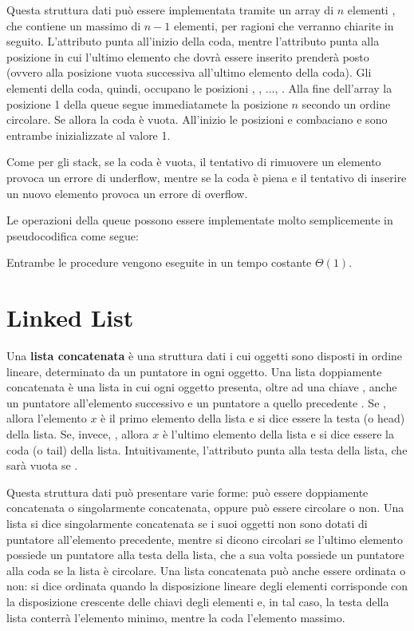 Questa struttura dati può essere implementata tramite un array di \(n\) elementi , che contiene un massimo di \(n-1\) elementi, per ragioni che verranno chiarite in seguito. L'attributo  punta all'inizio della coda, mentre l'attributo  punta alla posizione in cui l'ultimo elemento che dovrà essere inserito prenderà posto (ovvero alla posizione vuota successiva all'ultimo elemento della coda). Gli elementi della coda, quindi, occupano le posizioni , , ..., . Alla fine dell'array la posizione 1 della queue segue immediatamete la posizione \(n\) secondo un ordine circolare. Se  allora la coda è vuota. All'inizio le posizioni  e  combaciano e sono entrambe inizializzate al valore 1.

Come per gli stack, se la coda è vuota, il tentativo di rimuovere un elemento provoca un errore di underflow, mentre se  la coda è piena e il tentativo di inserire un nuovo elemento provoca un errore di overflow. 

Le operazioni della queue possono essere implementate molto semplicemente in pseudocodifica come segue:





Entrambe le procedure vengono eseguite in un tempo costante \(\Theta(1)\).

\section{Linked List}
Una \textbf{lista concatenata} è una struttura dati i cui oggetti sono disposti in ordine lineare, determinato da un puntatore in ogni oggetto. Una lista doppiamente concatenata è una lista in cui ogni oggetto presenta, oltre ad una chiave , anche un puntatore all'elemento successivo  e un puntatore a quello precedente . Se , allora l'elemento \(x\) è il primo elemento della lista e si dice essere la testa (o head) della lista. Se, invece, , allora \(x\) è l'ultimo elemento della lista e si dice essere la coda (o tail) della lista. Intuitivamente, l'attributo  punta alla testa della lista, che sarà vuota se .

Questa struttura dati può presentare varie forme: può essere doppiamente concatenata o singolarmente concatenata, oppure può essere circolare o non. Una lista si dice singolarmente concatenata se i suoi oggetti non sono dotati di puntatore all'elemento precedente, mentre si dicono circolari se l'ultimo elemento possiede un puntatore alla testa della lista, che a sua volta possiede un puntatore alla coda se la lista è circolare. Una lista concatenata può anche essere ordinata o non: si dice ordinata quando la disposizione lineare degli elementi corrisponde con la disposizione crescente delle chiavi degli elementi e, in tal caso, la testa della lista conterrà l'elemento minimo, mentre la coda l'elemento massimo. 

